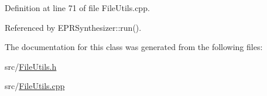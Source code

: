Definition at line 71 of file File\-Utils.\-cpp.



Referenced by E\-P\-R\-Synthesizer\-::run().



The documentation for this class was generated from the following files\-:\begin{DoxyCompactItemize}
\item 
src/\hyperlink{FileUtils_8h}{File\-Utils.\-h}\item 
src/\hyperlink{FileUtils_8cpp}{File\-Utils.\-cpp}\end{DoxyCompactItemize}
